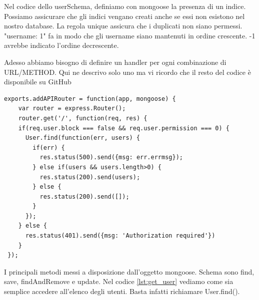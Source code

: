 Nel codice dello userSchema, definiamo con mongoose la presenza di un indice. 
Possiamo assicurare che gli indici vengano creati anche se essi non esistono nel nostro database. 
La regola unique assicura che i duplicati non siano permessi. "username: 1" fa in modo che gli username siano mantenuti in ordine crescente.
-1 avrebbe indicato l'ordine decrescente.

Adesso abbiamo bisogno di definire un handler per ogni combinazione di URL/METHOD.
Qui ne descrivo solo uno ma vi ricordo che il resto del codice è disponibile su GitHub
\begin{lstlisting}[caption={get user}, style=javaScriptCode, label={lst:get_user}]
exports.addAPIRouter = function(app, mongoose) {
  	var router = express.Router();
 	router.get('/', function(req, res) {
    if(req.user.block === false && req.user.permission === 0) {
      User.find(function(err, users) {
        if(err) {
          res.status(500).send({msg: err.errmsg});
        } else if(users && users.length>0) {
          res.status(200).send(users);
        } else {
          res.status(200).send([]);
        }
      });
    } else {
      res.status(401).send({msg: 'Authorization required'})
    }
 });
\end{lstlisting}


I principali metodi messi a disposizione dall'oggetto mongoose.
Schema sono find, save, findAndRemove e update. 
Nel codice \ref{lst:get_user} vediamo come sia semplice accedere all'elenco degli utenti. 
Basta infatti richiamare User.find().